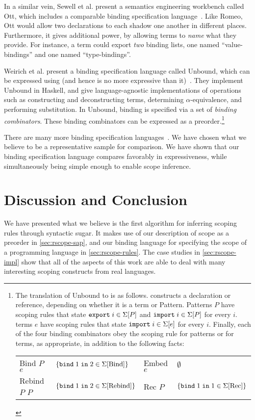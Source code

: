 In a similar vein, Sewell et al. present a semantics engineering
workbench called Ott, which includes a comparable binding
specification language~\cite{sewell-ott-jfp}. Like Romeo, Ott would allow two declarations
to each shadow one another in different places. Furthermore, it gives
additional power, by allowing terms to \emph{name} what they provide.
For instance, a term could export \emph{two} binding lists, one named
``value-bindings'' and one named ``type-bindings''.

Weirich et al. present a binding specification language called
Unbound, which can be expressed using {\sap} (and
hence is no more expressive than it)~\cite{weirich-scope}.
They implement Unbound in Haskell, and give language-agnostic
implementations of operations such as constructing and deconstructing
terms, determining $\alpha$-equivalence, and performing substitution.
In Unbound, binding is specified via a set of \emph{binding combinators}.
  These binding combinators can be expressed as a preorder.\footnote{
  The translation of Unbound to {\sap} is as follows. 
  constructs a declaration or reference, depending on whether it is a
  term or Pattern. Patterns $P$ have scoping rules that state
  $\SigPExpt{i}$ and $\SigPImpt{i}$ for every $i$. terms $e$ have
  scoping rules that state $\SigImpt{e}{i}$ for every $i$. Finally,
  each of the four binding combinators obey the scoping rule for
  patterns or for terms, as appropriate, in addition to the following
  facts:
  \begin{center}
  \begin{tabular}{l l @{\quad} l l}
    Bind $P$ $e$   & $\{\SigBind{\text{Bind}}{2}{1}\}$ &
    Embed $e$      & $\emptyset$ \\
    Rebind $P$ $P$ & $\{\SigBind{\text{Rebind}}{2}{1}\}$ &
    Rec $P$        & $\{\SigBind{\text{Rec}}{1}{1}\}$
  \end{tabular}
  \end{center}
}

There are many more binding specification
languages~\cite{aczel-church-rosser,pottier-caml,nabl}.
We have chosen what we believe to be a representative sample for
comparison. We have shown that our binding specification language
compares favorably in expressiveness, while simultaneously being
simple enough to enable scope inference.

\section{Discussion and Conclusion}
We have presented what we believe is the first algorithm for
inferring scoping rules through syntactic sugar. It makes use
of our description of scope as a preorder in
\cref{sec:rscope-sap}, and our binding language for specifying the
scope of a programming language in \cref{sec:rscope-rules}. The case studies
in \cref{sec:rscope-impl} show that all of the aspects of this work
are able to deal with many interesting scoping constructs from real
languages.

